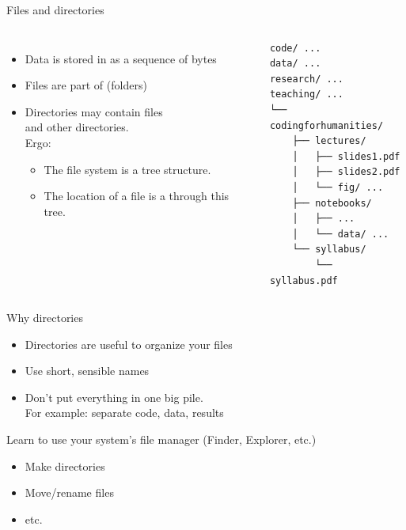 \documentclass[aspectratio=169,usenames,dvipsnames]{beamer}
\begin{document}
\begin{frame}[fragile]{Files and directories}
\begin{columns}
    \begin{itemize}
        \item Data is stored in  as a sequence of bytes
        \item Files are part of  (folders)
        \item Directories may contain files \\
            and other directories.\\
            Ergo:
            \begin{itemize}
                \item The file system is a tree structure.
                \item The location of a file is a 
                    through this tree.
            \end{itemize}
    \end{itemize}
\pause
{}
\begin{verbatim}
code/ ...
data/ ...
research/ ...
teaching/ ...
└── codingforhumanities/
    ├── lectures/
    │   ├── slides1.pdf
    │   ├── slides2.pdf
    │   └── fig/ ...
    ├── notebooks/
    │   ├── ...
    │   └── data/ ...
    └── syllabus/
        └── syllabus.pdf
\end{verbatim}
\end{columns}
\end{frame}

\begin{frame}{Why directories}
    \begin{itemize}
        \item Directories are useful to organize your files
        \item Use short, sensible names
        \item Don't put everything in one big pile. \\
            For example: separate code, data, results
    \end{itemize}
    \pause 
    Learn to use your system's file manager (Finder, Explorer, etc.)
    \begin{itemize}
        \item Make directories
        \item Move/rename files
        \item etc.
    \end{itemize}
    
\end{frame}
\end{document}

